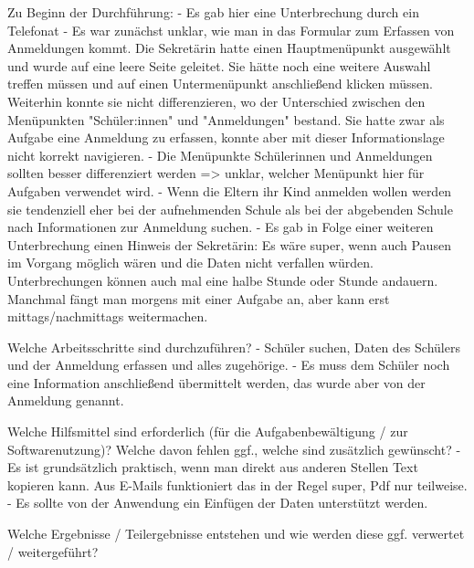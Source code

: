 Zu Beginn der Durchführung:	
- Es gab hier eine Unterbrechung durch ein Telefonat
- Es war zunächst unklar, wie man in das Formular zum Erfassen von Anmeldungen kommt. Die Sekretärin hatte einen Hauptmenüpunkt ausgewählt und wurde auf eine leere Seite geleitet. Sie hätte noch eine weitere Auswahl treffen müssen und auf einen Untermenüpunkt anschließend klicken müssen. Weiterhin konnte sie nicht differenzieren, wo der Unterschied zwischen den Menüpunkten "Schüler:innen" und "Anmeldungen" bestand. Sie hatte zwar als Aufgabe eine Anmeldung zu erfassen, konnte aber mit dieser Informationslage nicht korrekt navigieren. 
- Die Menüpunkte Schülerinnen und Anmeldungen sollten besser differenziert werden => unklar, welcher Menüpunkt hier für Aufgaben verwendet wird.
- Wenn die Eltern ihr Kind anmelden wollen werden sie tendenziell eher bei der aufnehmenden Schule als bei der abgebenden Schule nach Informationen zur Anmeldung suchen. 
- Es gab in Folge einer weiteren Unterbrechung einen Hinweis der Sekretärin: Es wäre super, wenn auch Pausen im Vorgang möglich wären und die Daten nicht verfallen würden. Unterbrechungen können auch mal eine halbe Stunde oder Stunde andauern. Manchmal fängt man morgens mit einer Aufgabe an, aber kann erst mittags/nachmittags weitermachen.



Welche Arbeitsschritte sind durchzuführen?	
- Schüler suchen, Daten des Schülers und der Anmeldung erfassen und alles zugehörige.
- Es muss dem Schüler noch eine Information anschließend übermittelt werden, das wurde aber von der Anmeldung genannt.	





Welche Hilfsmittel sind erforderlich (für die Aufgabenbewältigung / zur Softwarenutzung)? Welche davon fehlen ggf., welche sind zusätzlich gewünscht?	
- Es ist grundsätzlich praktisch, wenn man direkt aus anderen Stellen Text kopieren kann. Aus E-Mails funktioniert das in der Regel super, Pdf nur teilweise. 
- Es sollte von der Anwendung ein Einfügen der Daten unterstützt werden. 













Welche Ergebnisse / Teilergebnisse entstehen und wie werden diese ggf. verwertet / weitergeführt?	













